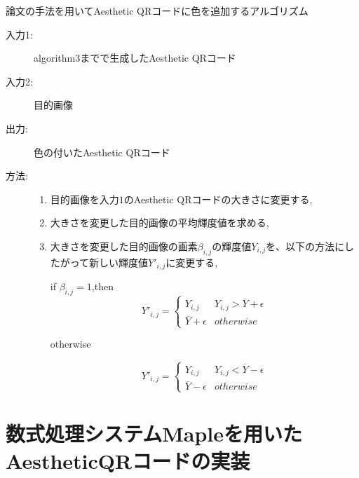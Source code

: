 \documentclass{thesis}
\begin{document}
\begin{algorithm}                      
\caption{論文\cite{KURI}の手法を用いてAesthetic QRコードに色を追加するアルゴリズム}         
\label{alg:alg4} 
\begin{description}
\item[入力1:] algorithm3までで生成したAesthetic QRコード
\item[入力2:] 目的画像
\item[出力:] 色の付いたAesthetic QRコード
\item[方法:]
\begin{enumerate}
\item
目的画像を入力$1$のAesthetic QRコードの大きさに変更する,
\item
大きさを変更した目的画像の平均輝度値を求める,
\item
大きさを変更した目的画像の画素$\beta_{i,j}$の輝度値$Y_{i,j}$を、以下の方法にしたがって新しい輝度値$Y'_{i,j}$に変更する,

if $\beta_{i,j} = 1$,then
\begin{equation}
{Y'_{i,j} = }
\begin{cases}
Y_{i,j} & Y_{i,j} > \overline{Y}+\epsilon \\
\overline{Y}+\epsilon & otherwise 
\end{cases}
\end{equation}

otherwise

\begin{equation}
{Y'_{i,j} = }
\begin{cases}
Y_{i,j} & Y_{i,j} < \overline{Y}-\epsilon \\
\overline{Y}-\epsilon & otherwise 
\end{cases}
\end{equation}

\end{enumerate}
\end{description}
\end{algorithm} 


\chapter{数式処理システムMapleを用いたAestheticQRコードの実装}
\label{chap:4}
\end{document}
